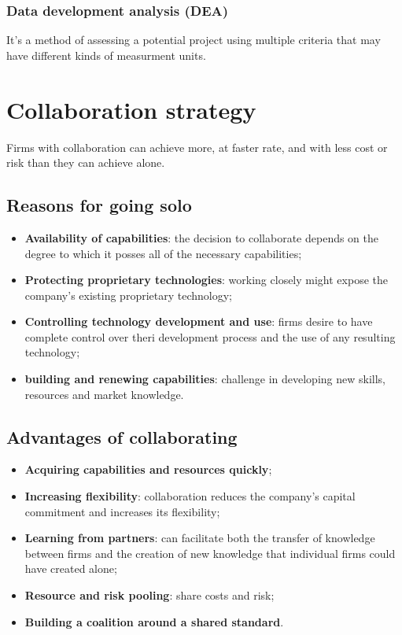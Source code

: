 \documentclass[12pt]{article}
\begin{document}
\subsubsection{Data development analysis (DEA)}
It's a method of assessing a potential project using multiple criteria that may have different kinds of measurment units.
\section{Collaboration strategy}
Firms with collaboration can achieve more, at faster rate, and with less cost or risk than they can achieve alone.
\subsection{Reasons for going solo}
\begin{itemize}
    \item \textbf{Availability of capabilities}: the decision to collaborate depends on the degree to which it posses all of the necessary capabilities;
    \item \textbf{Protecting proprietary technologies}: working closely might expose the company's existing proprietary technology;
    \item \textbf{Controlling technology development and use}: firms desire to have complete control over theri development process and the use of any resulting technology;
    \item \textbf{building and renewing capabilities}: challenge in developing new skills, resources and market knowledge.
\end{itemize}
\subsection{Advantages of collaborating}
\begin{itemize}
    \item \textbf{Acquiring capabilities and resources quickly}; 
    \item \textbf{Increasing flexibility}: collaboration reduces the company's capital commitment and increases its flexibility; 
    \item \textbf{Learning from partners}: can facilitate both the transfer of knowledge between firms and the creation of new knowledge that individual firms could have created alone; 
    \item \textbf{Resource and risk pooling}: share costs and risk;
    \item \textbf{Building a coalition around a shared standard}. 
\end{itemize}
\end{document}

